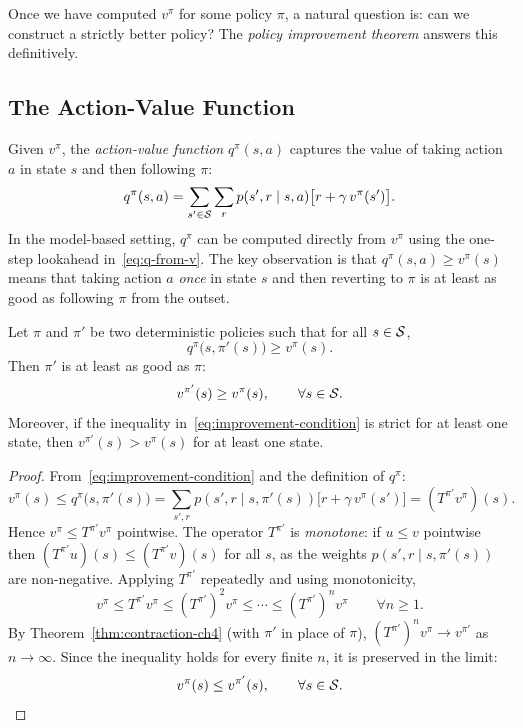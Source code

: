 Once we have computed $v^\pi$ for some policy $\pi$, a natural question is: can we construct a strictly better policy?  The \emph{policy improvement theorem} answers this definitively.

\subsection*{The Action-Value Function}

Given $v^\pi$, the \emph{action-value function} $q^\pi(s,a)$ captures the value of taking action $a$ in state $s$ and then following $\pi$:
\begin{equation}
\label{eq:q-from-v}
q^\pi(s,a) = \sum_{s' \in \mathcal{S}}\sum_r p(s',r \mid s,a)\bigl[r + \gamma\,v^\pi(s')\bigr].
\end{equation}
In the model-based setting, $q^\pi$ can be computed directly from $v^\pi$ using the one-step lookahead in~\eqref{eq:q-from-v}.  The key observation is that $q^\pi(s, a) \ge v^\pi(s)$ means that taking action $a$ \emph{once} in state $s$ and then reverting to $\pi$ is at least as good as following $\pi$ from the outset.

\begin{theorem}
\label{thm:policy-improvement}
Let $\pi$ and $\pi'$ be two deterministic policies such that for all $s \in \mathcal{S}$,
\begin{equation}
\label{eq:improvement-condition}
q^\pi\bigl(s, \pi'(s)\bigr) \ge v^\pi(s).
\end{equation}
Then $\pi'$ is at least as good as $\pi$:
\[
v^{\pi'}(s) \ge v^\pi(s), \qquad \forall s \in \mathcal{S}.
\]
Moreover, if the inequality in~\eqref{eq:improvement-condition} is strict for at least one state, then $v^{\pi'}(s) > v^\pi(s)$ for at least one state.
\end{theorem}

\begin{proof}
From~\eqref{eq:improvement-condition} and the definition of $q^\pi$:
\[
v^\pi(s) \le q^\pi\bigl(s, \pi'(s)\bigr)
= \sum_{s',r} p(s',r \mid s, \pi'(s))\bigl[r + \gamma\,v^\pi(s')\bigr]
= (T^{\pi'} v^\pi)(s).
\]
Hence $v^\pi \le T^{\pi'} v^\pi$ pointwise.  The operator $T^{\pi'}$ is \emph{monotone}: if $u \le v$ pointwise then $(T^{\pi'} u)(s) \le (T^{\pi'} v)(s)$ for all $s$, as the weights $p(s',r \mid s, \pi'(s))$ are non-negative.  Applying $T^{\pi'}$ repeatedly and using monotonicity,
\[
v^\pi \le T^{\pi'} v^\pi \le (T^{\pi'})^2 v^\pi \le \cdots \le (T^{\pi'})^n v^\pi \qquad \forall n \ge 1.
\]
By Theorem~\ref{thm:contraction-ch4} (with $\pi'$ in place of $\pi$), $(T^{\pi'})^n v^\pi \to v^{\pi'}$ as $n \to \infty$.  Since the inequality holds for every finite $n$, it is preserved in the limit:
\[
v^\pi(s) \le v^{\pi'}(s), \qquad \forall s \in \mathcal{S}. \qedhere
\]
\end{proof}

